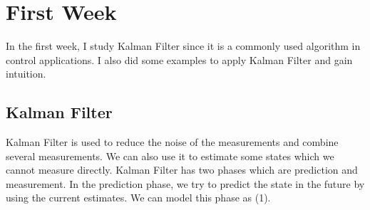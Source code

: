 \documentclass[12pt]{article}
\begin{document}
    \section{First Week}    
    In the first week, I study Kalman Filter since it is a commonly used 
    algorithm in control applications. I also did some examples to apply 
    Kalman Filter and gain intuition.

    \subsection{Kalman Filter}
    Kalman Filter is used to reduce the noise of the measurements and 
    combine several measurements. We can also use it to estimate some 
    states which we cannot measure directly. 
    Kalman Filter has two phases which are prediction and measurement. 
    In the prediction phase, we try to predict the state in the future by using 
    the current estimates. We can model this phase as (1).
\end{document}
